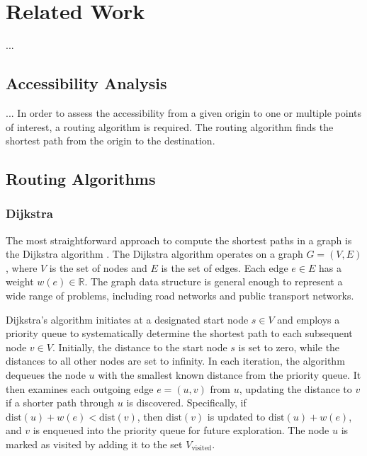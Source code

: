\clearpage
\section{Related Work}
\label{sec:related_work}

...

\subsection{Accessibility Analysis}
\label{subsec:accessibility_analysis}


...
In order to assess the accessibility from a given origin to one or multiple
points of interest, a routing algorithm is required. The routing algorithm finds
the shortest path from the origin to the destination.

\subsection{Routing Algorithms}
\label{subsec:routing_algorithms}


\subsubsection{Dijkstra}
\label{subsubsec:dijkstra}
The most straightforward approach to compute the shortest paths in a graph is the Dijkstra algorithm \cite{dijkstra1959note}.
The Dijkstra algorithm operates on a graph \( G = (V, E) \), where \( V \) is the set of nodes and \( E \) is the set of edges.
Each edge \( e \in E \) has a weight \( w(e) \in \mathbb{R}\). The graph data structure is general enough to represent a wide range of problems, including road networks and public transport networks.

Dijkstra's algorithm initiates at a designated start node \( s \in V \) and employs a priority queue to systematically determine the shortest path to each subsequent node \( v \in V \).
Initially, the distance to the start node \( s \) is set to zero, while the distances to all other nodes are set to infinity.
In each iteration, the algorithm dequeues the node \( u \) with the smallest known distance from the priority queue.
It then examines each outgoing edge \( e = (u, v) \) from \( u \), updating the distance to \( v \) if a shorter path through \( u \) is discovered.
Specifically, if \( \text{dist}(u) + w(e) < \text{dist}(v) \), then \( \text{dist}(v) \) is updated to \( \text{dist}(u) + w(e) \), and \( v \) is enqueued into the priority queue for future exploration.
The node \( u \) is marked as visited by adding it to the set \( V_{\text{visited}} \).


